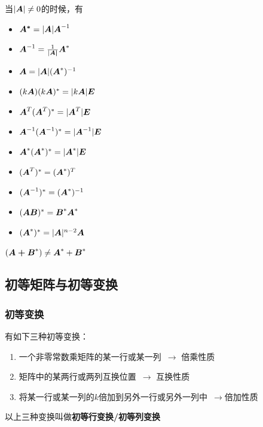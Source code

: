 \documentclass[12pt, a4paper, oneside, UTF8]{ctexbook}
\begin{document}
当$|\boldsymbol{A}|\neq0$的时候，有
\begin{multicols}{2}
\begin{itemize}[leftmargin=4em]
    \item $\boldsymbol{A^*}=|\boldsymbol{A}|\boldsymbol{A}^{-1}$
    \item $\boldsymbol{A}^{-1}=\frac{1}{|\boldsymbol{A|}}\boldsymbol{A}^*$
    \item $\boldsymbol{A}=|\boldsymbol{A}| ({\boldsymbol{A}}^*)^{-1}$
    \item $ (k\boldsymbol{A}) (k\boldsymbol{A})^*=|k\boldsymbol{A}|\boldsymbol{E}$
    \item $\boldsymbol{A}^T (\boldsymbol{A}^T)^*=|\boldsymbol{A}^T|\boldsymbol{E}$
    \item $\boldsymbol{A}^{-1} (\boldsymbol{A}^{-1})^*=|\boldsymbol{A}^{-1}|\boldsymbol{E}$
    \item $\boldsymbol{A}^* (\boldsymbol{A}^*)^*=|\boldsymbol{A}^*|\boldsymbol{E}$
    \item $ (\boldsymbol{A}^T)^*= (\boldsymbol{A}^*)^T$
    \item $ (\boldsymbol{A}^{-1})^*= (\boldsymbol{A}^*)^{-1}$
    \item $ (\boldsymbol{AB})^*=\boldsymbol{B}^*\boldsymbol{A}^*$
    \item $ (\boldsymbol{A}^*)^*=|\boldsymbol{A}|^{n-2}\boldsymbol{A}$
\end{itemize}
\end{multicols}
\begin{rmk}
    $ (\boldsymbol{A+B}^*)\neq\boldsymbol{A}^*+\boldsymbol{B}^*$
\end{rmk}
\subsection{初等矩阵与初等变换}
\subsubsection{初等变换}
有如下三种初等变换：
\begin{enumerate}[leftmargin=4em]
    \item 一个非零常数乘矩阵的某一行或某一列\ $\rightarrow$ 倍乘性质
    \item 矩阵中的某两行或两列互换位置\ $\rightarrow$ 互换性质
    \item 将某一行或某一列的$k$倍加到另外一行或另外一列中\ $\rightarrow$倍加性质
\end{enumerate}

以上三种变换叫做\textbf{初等行变换/初等列变换}
\end{document}
